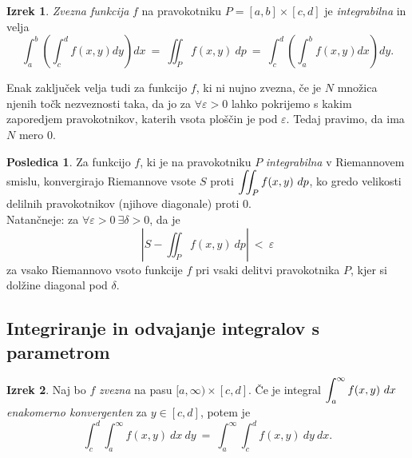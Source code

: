 \documentclass[11pt]{article}
\theoremstyle{definition}
\theoremstyle{definition}
\theoremstyle{definition}
\newtheorem{izrek}{Izrek}[section]
\newtheorem*{posledica}{Posledica}
\begin{document}
\begin{izrek}

\textit{Zvezna funkcija} $f$ na pravokotniku $P = [a, b] \times [c, d]$ je \textit{integrabilna} in velja
\begin{equation}
\int_{a}^{b} \left( \int_{c}^{d} f(x, y) dy \right) dx ~=~ \iint_P f(x, y)~dp ~=~ \int_{c}^{d} \left( \int_{a}^{b} f(x, y) dx \right) dy.
\end{equation}

Enak zaključek velja tudi za funkcijo $f$, ki ni nujno zvezna, če je $N$ množica njenih točk nezveznosti taka, da jo za $\forall \varepsilon > 0$ lahko pokrijemo s kakim zaporedjem pravokotnikov, katerih vsota ploščin je pod $\varepsilon$. Tedaj pravimo, da ima $N$ mero $0$.

\end{izrek}
\vspace{0.5cm}

\begin{posledica}

Za funkcijo $f$, ki je na pravokotniku $P$ \textit{integrabilna} v Riemannovem smislu, konvergirajo Riemannove vsote $S$ proti $\mathlarger{\iint_P f(x, y)~dp}$, ko gredo velikosti delilnih pravokotnikov (njihove diagonale) proti $0$. \\

\noindent Natančneje: za $\forall \varepsilon > 0 ~\exists \delta > 0$, da je 
$$\left| S - \iint_P f(x, y)~dp \right| ~<~ \varepsilon$$
za vsako Riemannovo vsoto funkcije $f$ pri vsaki delitvi pravokotnika $P$, kjer si dolžine diagonal pod $\delta$.

\end{posledica}
\vspace{0.5cm}


\subsection{Integriranje in odvajanje integralov s parametrom}
\vspace{0.5cm}

\begin{izrek}

Naj bo $f$ \textit{zvezna} na pasu $[a, \infty) \times [c, d]$. Če je integral $\mathlarger{\int_a^{\infty} f(x, y)~dx}$ \textit{enakomerno konvergenten} za $y \in [c, d]$, potem je
$$\int_c^d \int_a^{\infty} f(x, y) ~dx ~dy ~=~ \int_a^{\infty} \int_c^d f(x, y) ~dy ~dx.$$

\end{izrek}
\vspace{0.5cm}
\end{document}

